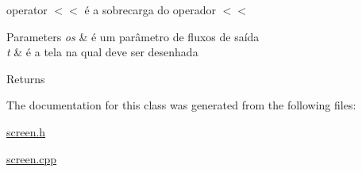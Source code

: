 operator $<$$<$ é a sobrecarga do operador $<$$<$ 


\begin{DoxyParams}{Parameters}
{\em os} & é um parâmetro de fluxos de saída \\
\hline
{\em t} & é a tela na qual deve ser desenhada \\
\hline
\end{DoxyParams}
\begin{DoxyReturn}{Returns}

\end{DoxyReturn}


The documentation for this class was generated from the following files\+:\begin{DoxyCompactItemize}
\item 
\hyperlink{screen_8h}{screen.\+h}\item 
\hyperlink{screen_8cpp}{screen.\+cpp}\end{DoxyCompactItemize}
